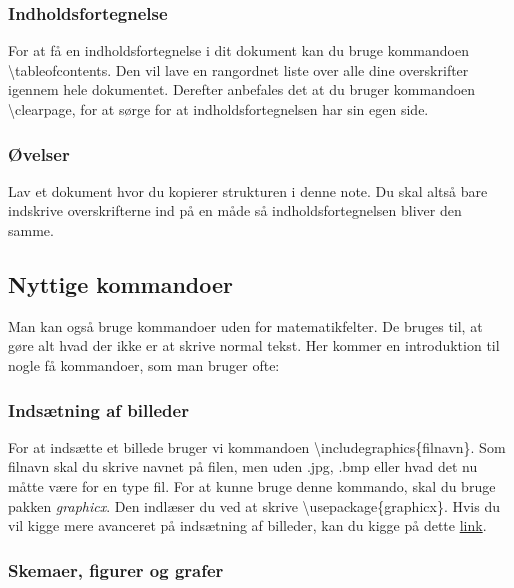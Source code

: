 \subsubsection{Indholdsfortegnelse}
For at få en indholdsfortegnelse i dit dokument kan du bruge kommandoen \textbackslash tableofcontents.
Den vil lave en rangordnet liste over alle dine overskrifter igennem hele dokumentet.
Derefter anbefales det at du bruger kommandoen \textbackslash clearpage, for at sørge for at indholdsfortegnelsen har sin egen side.

\subsubsection{Øvelser}
\begin{opg}
Lav et dokument hvor du kopierer strukturen i denne note.
Du skal altså bare indskrive overskrifterne ind på en måde så indholdsfortegnelsen bliver den samme.
\end{opg}

\subsection{Nyttige kommandoer}
Man kan også bruge kommandoer uden for matematikfelter. 
De bruges til, at gøre alt hvad der ikke er at skrive normal tekst.
Her kommer en introduktion til nogle få kommandoer, som man bruger ofte:
\subsubsection{Indsætning af billeder}

For at indsætte et billede bruger vi kommandoen \textbackslash includegraphics\{filnavn\}. 
Som filnavn skal du skrive navnet på filen, 
men uden .jpg, .bmp eller hvad det nu måtte være for en type fil.
For at kunne bruge denne kommando, skal du bruge pakken \textit{graphicx}. 
Den indlæser du ved at skrive \textbackslash usepackage\{graphicx\}. 
Hvis du vil kigge mere avanceret på indsætning af billeder, kan du kigge på dette \href{https://en.wikibooks.org/wiki/LaTeX/Importing_Graphics}{link}.

\subsubsection{Skemaer, figurer og grafer}